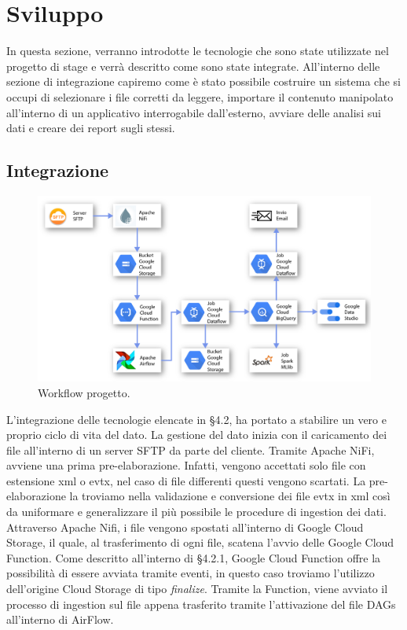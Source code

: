 \chapter{Sviluppo}
In questa sezione, verranno introdotte le tecnologie che sono state utilizzate nel progetto di stage e verrà descritto come sono state integrate. All'interno delle sezione di integrazione capiremo come è stato possibile costruire un sistema che si occupi di selezionare i file corretti da leggere, importare il contenuto manipolato all'interno di un applicativo interrogabile dall'esterno, avviare delle analisi sui dati e creare dei report sugli stessi.
\section{Integrazione}
\begin{figure}[h!]
	\centering
	\includegraphics[scale=0.7]{figures/Schema_complessivo}
	\caption[Workflow progetto	.]{Workflow progetto.
		\label{fig:logoGCP}}
\end{figure}	
L'integrazione delle tecnologie elencate in §4.2, ha portato a stabilire un vero e proprio ciclo di vita del dato.
La gestione del dato inizia con il caricamento dei file all'interno di un \gls{server SFTP} da parte del cliente. Tramite Apache NiFi, avviene una prima pre-elaborazione. Infatti, vengono accettati solo file con estensione xml o evtx, nel caso di file differenti questi vengono scartati. La pre-elaborazione la troviamo nella validazione e conversione dei file evtx in xml così da uniformare e generalizzare il più possibile le procedure di ingestion dei dati.
\\
Attraverso Apache Nifi, i file vengono spostati all'interno di Google Cloud Storage, il quale, al trasferimento di ogni file, scatena l'avvio delle Google Cloud Function. Come descritto all'interno di §4.2.1, Google Cloud Function offre la possibilità di essere avviata tramite eventi, in questo caso troviamo l'utilizzo dell'origine Cloud Storage di tipo \emph{finalize}. Tramite la Function, viene avviato il processo di ingestion sul file appena trasferito tramite l'attivazione del file DAGs all'interno di AirFlow.

